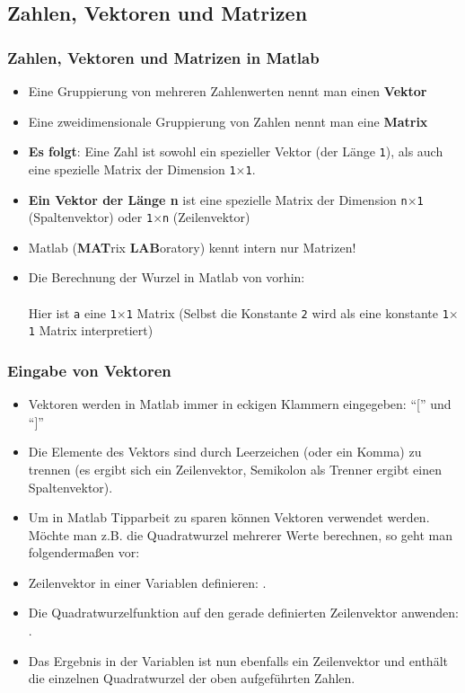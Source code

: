 \subsection{Zahlen, Vektoren und Matrizen}
\begin{frame}
  \frametitle{Zahlen, Vektoren und Matrizen in Matlab}
  \begin{itemize}
      \item Eine Gruppierung von mehreren Zahlenwerten nennt man einen \textbf{Vektor}
      \item Eine zweidimensionale Gruppierung von Zahlen nennt man eine \textbf{Matrix}
      \item \textbf{Es folgt}: Eine Zahl ist sowohl ein spezieller Vektor (der Länge \texttt{1}), als auch eine spezielle Matrix der Dimension \texttt{1$\times$1}.
      \item \textbf{Ein Vektor der Länge n} ist eine spezielle Matrix der Dimension \texttt{n$\times$1} (Spaltenvektor) oder \texttt{1$\times$n} (Zeilenvektor)
      \item Matlab (\textbf{MAT}rix \textbf{LAB}oratory) kennt intern nur Matrizen!
      \item Die Berechnung der Wurzel in Matlab von vorhin: \\
       \\
      Hier ist \texttt{a} eine \texttt{1$\times$1} Matrix (Selbst die Konstante \texttt{2} wird als eine konstante \texttt{1$\times$1} Matrix interpretiert)
  \end{itemize}
\end{frame}

\begin{frame}
  \frametitle{Eingabe von Vektoren}

  \vspace{-0.5cm}

  \begin{itemize}
      \item Vektoren werden in Matlab immer in eckigen Klammern eingegeben: ``['' und ``]''
      \item Die Elemente des Vektors sind durch Leerzeichen (oder ein Komma) zu trennen
      (es ergibt sich ein Zeilenvektor, Semikolon als Trenner ergibt einen Spaltenvektor).
      \item Um in Matlab Tipparbeit zu sparen können Vektoren verwendet werden.
      Möchte man z.B. die Quadratwurzel mehrerer Werte berechnen, so geht man folgendermaßen vor:
      \item Zeilenvektor in einer Variablen definieren: .
      \item Die Quadratwurzelfunktion auf den gerade definierten Zeilenvektor  anwenden: .
      \item Das Ergebnis in der Variablen  ist nun ebenfalls ein Zeilenvektor und enthält die einzelnen
      Quadratwurzel der oben aufgeführten Zahlen.
  \end{itemize}
\end{frame}






